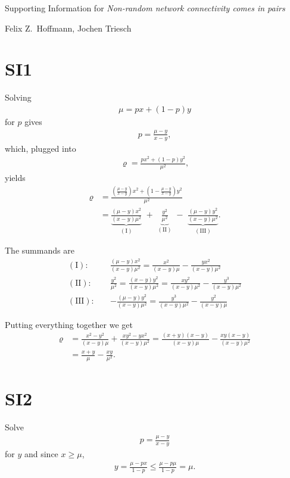 \documentclass[11pt, paper=a4]{article}
\begin{document}
\begin{center}
  \Large
  Supporting Information for \textit{Non-random network connectivity comes in pairs}
  \smallskip
  \normalsize
  
  Felix Z.~Hoffmann, Jochen Triesch
\end{center}

\section*{SI1}

Solving
\begin{align}
\mu = px + (1-p)y
\end{align}
for $p$ gives
\begin{align}
  p = \frac{\mu-y}{x-y},
\end{align}
%
which, plugged into
\begin{align}
  \varrho = \frac{p x^2 + (1-p) y^2}{\mu^2},
\end{align}
yields
\begin{align}
  \varrho & = \frac{\left(\frac{\mu-y}{x-y}\right)x^2  + \left(1-\frac{\mu-y}{x-y}\right) y^2}{\mu^2} \\ & = \underbrace{\frac{(\mu - y)x^2}{(x-y)\mu^2}}_{\mathrm{(I)}}\,\, + \,\, \underbrace{\frac{y^2}{\mu^2}}_{\mathrm{(II)}}\,\, - \,\, \underbrace{\frac{(\mu - y)y^2}{(x-y) \mu^2}}_{\mathrm{(III)}}.
\end{align}

The summands are
\begin{align}
  \mathrm{(I):} \quad & \frac{(\mu - y)x^2}{(x-y)\mu^2} = \frac{x^2}{(x-y)\mu} - \frac{yx^2}{(x-y)\mu^2} \\
  \mathrm{(II):} \quad &  \frac{y^2}{\mu^2} = \frac{(x-y)y^2}{(x-y)\mu^2} = \frac{xy^2}{(x-y)\mu^2} - \frac{y^3}{(x-y)\mu^2} \\
  \mathrm{(III):} \quad & - \frac{(\mu - y)y^2}{(x-y) \mu^2} = \frac{y^3}{(x-y)\mu^2} - \frac{y^2}{(x-y)\mu}
\end{align}

Putting everything together we get
\begin{align}
  \varrho & =  \frac{x^2 - y^2}{(x-y)\mu} + \frac{xy^2 -yx^2}{(x-y)\mu^2}  = \frac{(x + y) (x-y)}{(x-y)\mu} - \frac{xy (x-y)}{(x-y)\mu^2} \\
  & = \frac{x+y}{\mu} - \frac{xy}{\mu^2}.
\end{align}

\section*{SI2}
Solve
\begin{align}
  p = \frac{\mu-y}{x-y}
\end{align}
for $y$ and since $x \geq \mu$,
\begin{align}
y = \frac{\mu - px}{1-p} \leq \frac{\mu - p\mu}{1-p} = \mu.
\end{align}
\end{document}
